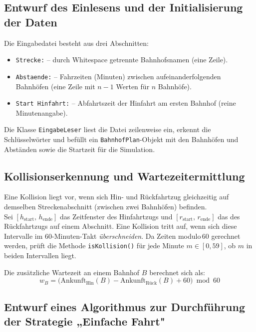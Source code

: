 \documentclass[12pt,a4paper]{article}
\begin{document}
\subsection{Entwurf des Einlesens und der Initialisierung der Daten}

Die Eingabedatei besteht aus drei Abschnitten:
\begin{itemize}
  \item \texttt{Strecke:} -- durch Whitespace getrennte Bahnhofsnamen (eine Zeile).
  \item \texttt{Abstaende:} -- Fahrzeiten (Minuten) zwischen aufeinanderfolgenden
        Bahnhöfen (eine Zeile mit $n-1$ Werten für $n$ Bahnhöfe).
  \item \texttt{Start Hinfahrt:} -- Abfahrtszeit der Hinfahrt am ersten Bahnhof (reine Minutenangabe).
\end{itemize}

\noindent
Die Klasse \texttt{EingabeLeser} liest die Datei zeilenweise ein, erkennt die
Schlüsselwörter und befüllt ein \texttt{BahnhofPlan}-Objekt mit den Bahnhöfen
und Abständen sowie die Startzeit für die Simulation.

\subsection{Kollisionserkennung und Wartezeitermittlung}

Eine Kollision liegt vor, wenn sich Hin- und Rückfahrtzug gleichzeitig auf
demselben Streckenabschnitt (zwischen zwei Bahnhöfen) befinden. \\[0.3em]

\noindent
Sei $[h_{\text{start}},\, h_{\text{ende}}]$ das Zeitfenster des Hinfahrtzugs und
$[r_{\text{start}},\, r_{\text{ende}}]$ das des Rückfahrtzugs auf einem Abschnitt.
Eine Kollision tritt auf, wenn sich diese Intervalle im 60-Minuten-Takt
\emph{überschneiden}. Da Zeiten modulo\,60 gerechnet werden, prüft die Methode
\texttt{isKollision()} für jede Minute $m \in [0,59]$, ob $m$ in beiden
Intervallen liegt.

\bigskip
\noindent
Die zusätzliche Wartezeit an einem Bahnhof $B$ berechnet sich als:
\[
  w_B = \bigl(\text{Ankunft}_{\text{Hin}}(B) - \text{Ankunft}_{\text{Rück}}(B) + 60\bigr) \bmod 60
\]

\subsection{Entwurf eines Algorithmus zur Durchführung der Strategie „Einfache Fahrt"}
\end{document}

